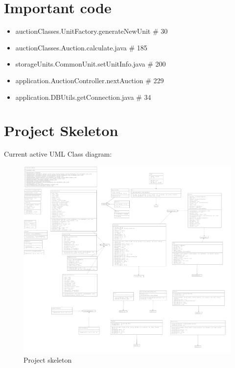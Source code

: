 \documentclass[
]{report}
\providecommand{\tightlist}{%
  \setlength{\itemsep}{0pt}\setlength{\parskip}{0pt}}
\begin{document}
\hypertarget{important-code}{%
\section{Important code}\label{important-code}}

\begin{itemize}
\tightlist
\item
  auctionClasses.UnitFactory.generateNewUnit \# 30
\item
  auctionClasses.Auction.calculate.java \# 185
\item
  storageUnits.CommonUnit.setUnitInfo.java \# 200
\item
  application.AuctionController.nextAuction \# 229
\item
  application.DBUtils.getConnection.java \# 34
\end{itemize}

\hypertarget{project-skeleton}{%
\section{Project Skeleton}\label{project-skeleton}}

Current active UML Class diagram:

\begin{figure}
\centering
\includegraphics{images/UMLv1.0.2.png}
\caption{Project skeleton}
\end{figure}
\end{document}

